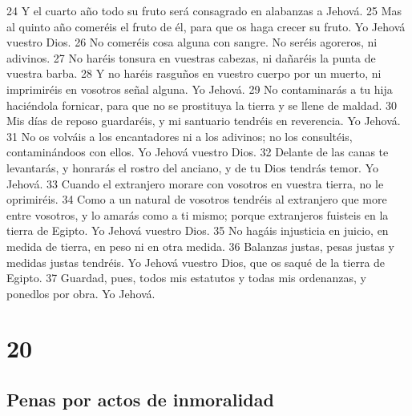 24 Y el cuarto año todo su fruto será consagrado en alabanzas a Jehová.
25 Mas al quinto año comeréis el fruto de él, para que os haga crecer su fruto. Yo Jehová vuestro Dios.
26 No comeréis cosa alguna con sangre. No seréis agoreros, ni adivinos.
27 No haréis tonsura en vuestras cabezas, ni dañaréis la punta de vuestra barba.
28 Y no haréis rasguños en vuestro cuerpo por un muerto, ni imprimiréis en vosotros señal alguna. Yo Jehová.
29 No contaminarás a tu hija haciéndola fornicar,  para que no se prostituya la tierra y se llene de maldad.
30 Mis días de reposo guardaréis, y mi santuario tendréis en reverencia. Yo Jehová.
31 No os volváis a los encantadores ni a los adivinos; no los consultéis, contaminándoos con ellos. Yo Jehová vuestro Dios.
32 Delante de las canas te levantarás, y honrarás el rostro del anciano, y de tu Dios tendrás temor. Yo Jehová.
33 Cuando el extranjero morare con vosotros en vuestra tierra, no le oprimiréis.
34 Como a un natural de vosotros tendréis al extranjero que more entre vosotros, y lo amarás como a ti mismo; porque extranjeros fuisteis en la tierra de Egipto. Yo Jehová vuestro Dios.
35 No hagáis injusticia en juicio, en medida de tierra, en peso ni en otra medida.
36 Balanzas justas, pesas justas y medidas justas tendréis. Yo Jehová vuestro Dios, que os saqué de la tierra de Egipto.
37 Guardad, pues, todos mis estatutos y todas mis ordenanzas, y ponedlos por obra. Yo Jehová. 

\chapter{20}

\section*{Penas por actos de inmoralidad}

